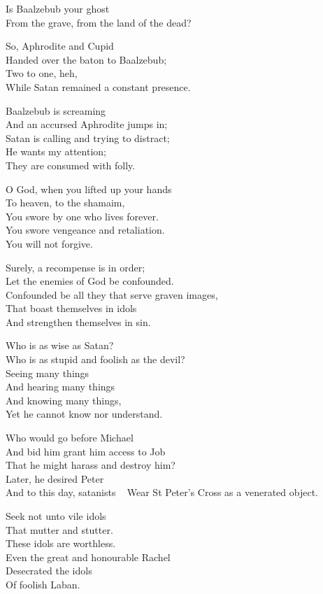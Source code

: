 \documentclass[
]{book}
\begin{document}
Is Baalzebub your ghost\\
From the grave, from the land of the dead?

So, Aphrodite and Cupid\\
Handed over the baton to Baalzebub;\\
Two to one, heh,\\
While Satan remained a constant presence.

Baalzebub is screaming\\
And an accursed Aphrodite jumps in;\\
Satan is calling and trying to distract;\\
He wants my attention;\\
They are consumed with folly.

O God, when you lifted up your hands\\
To heaven, to the shamaim,\\
You swore by one who lives forever.\\
You swore vengeance and retaliation.\\
You will not forgive.

Surely, a recompense is in order;\\
Let the enemies of God be confounded.\\
Confounded be all they that serve graven images,\\
That boast themselves in idols\\
And strengthen themselves in sin.

Who is as wise as Satan?\\
Who is as stupid and foolish as the devil?\\
Seeing many things\\
And hearing many things\\
And knowing many things,\\
Yet he cannot know nor understand.

Who would go before Michael\\
And bid him grant him access to Job\\
That he might harass and destroy him?\\
Later, he desired Peter\\
And to this day, satanists ~
Wear St Peter's Cross as a venerated object.

Seek not unto vile idols\\
That mutter and stutter.\\
These idols are worthless.\\
Even the great and honourable Rachel\\
Desecrated the idols\\
Of foolish Laban.
\end{document}

